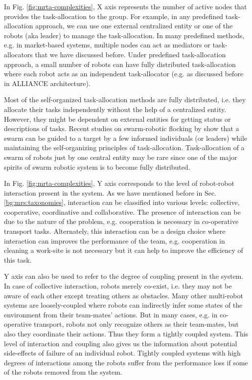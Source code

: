 In Fig. \ref{fig:mrta-complexities}, X axis represents the number of active nodes that provides the task-allocation to the group. For example, in any predefined  task-allocation approach, we can use one external centralized entity or one of the robots (aka leader) to manage the task-allocation. In many predefined methods, e.g. in market-based systems,  multiple nodes can act as mediators or task-allocators that we have discussed before. Under predefined task-allocation approach,  a small number of robots can have fully distributed task-allocation where each robot acts as an independent task-allocator (e.g. as discussed before in ALLIANCE architecture). 

Most of the self-organized task-allocation methods are fully distributed, i.e. they allocate their tasks independently without the help of a centralized entity. However, they might be dependent on external entities for getting status or descriptions of tasks. Recent studies on swarm-robotic flocking by  show that a swarm can be guided to a target by a few informed individuals (or leaders) while  maintaining the self-organizing principles of task-allocation. Task-allocation of a swarm of robots  just by one central entity may be rare since one of the major spirits of swarm robotic system is to become fully distributed.

In Fig. \ref{fig:mrta-complexities},  Y axis corresponds to the level of robot-robot interaction present in the system. As we have mentioned before in Sec. \ref{bg:mrs:taxonomies}, interaction can be classified into various levels: collective, cooperative, coordinative and collaborative. The presence of interaction can be due to the nature of the problem, e.g. cooperation is necessary in co-operative transport tasks. Alternately, this interaction can be a design choice where interaction can improves the performance of the team, e.g. cooperation in cleaning a work-site is not necessary but it can help to improve the  efficiency of this task. 

Y axis can also be used to refer to the degree of coupling present in the system.  In case of collective interaction, robots merely co-exist, i.e.  they may not be aware of each other except treating others as obstacles. Many other multi-robot systems are loosely-coupled where robots can indirectly infer some states of the environment from their team-mates' actions.  But in many cases, e.g. in  co-operative transport, robots not only recognize others as their team-mates, but also they coordinate their actions. Thus they form a  tightly coupled system. This level of interaction and coupling also gives us the information about potential side-effects of failure of an individual robot. Tightly coupled systems with high degrees of interactions among the robots  suffer from the performance loss if some of the robots removed from the system.

